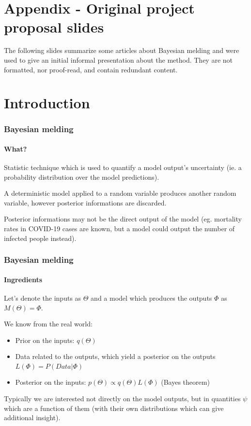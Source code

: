 \documentclass[aspectratio=43]{beamer}
\begin{document}
\section{Appendix - Original project proposal slides}
\begin{frame}
	The following slides summarize some articles about Bayesian melding and were used to give an initial informal presentation about the method. They are not formatted, nor proof-read, and contain redundant content.
\end{frame}

\section{Introduction~}

\begin{frame}
	\frametitle{Bayesian melding}
	\framesubtitle{What?}
	
	Statistic technique which is used to quantify a model output's uncertainty (ie. a probability distribution over the model predictions).
	
	A deterministic model applied to a random variable produces another random variable, however posterior informations are discarded.
	
	Posterior informations may not be the direct output of the model (eg. mortality rates in COVID-19 cases are known, but a model could output the number of infected people instead).
	
\end{frame}

\begin{frame}
	\frametitle{Bayesian melding}
	\framesubtitle{Ingredients}
	
	Let's denote the inputs as $\Theta$ and a model which produces the outputs $\Phi$ as $M(\Theta) = \Phi$.
	
	We know from the real world:
	\begin{itemize}
		\item Prior on the inputs: $q(\Theta)$
		\item Data related to the outputs, which yield a posterior on the outputs $L(\Phi) = P(Data | \Phi)$
		\item Posterior on the inputs: $p(\Theta) \propto q(\Theta)L(\Phi)$ (Bayes theorem)
	\end{itemize}

	Typically we are interested not directly on the model outputs, but in quantities $\psi$ which are a function of them (with their own distributions which can give additional insight).
\end{frame}
\end{document}
